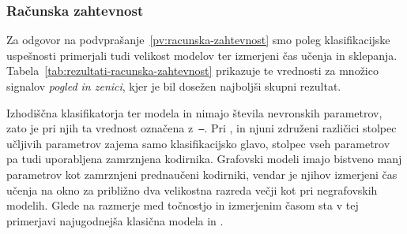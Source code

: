 \subsubsection*{Računska zahtevnost}

Za odgovor na podvprašanje~\ref{pv:racunska-zahtevnost} smo poleg klasifikacijske uspešnosti primerjali tudi velikost modelov ter izmerjeni čas učenja in sklepanja.
Tabela~\ref{tab:rezultati-racunska-zahtevnost} prikazuje te vrednosti za množico signalov \emph{pogled in zenici}, kjer je bil dosežen najboljši skupni rezultat.

Izhodiščna klasifikatorja ter modela  in  nimajo števila nevronskih parametrov, zato je pri njih ta vrednost označena z~\texttt{--}.
Pri ,  in njuni združeni različici stolpec učljivih parametrov zajema samo klasifikacijsko glavo, stolpec vseh parametrov pa tudi uporabljena zamrznjena kodirnika.
Grafovski modeli imajo bistveno manj parametrov kot zamrznjeni prednaučeni kodirniki, vendar je njihov izmerjeni čas učenja na okno za približno dva velikostna razreda večji kot pri negrafovskih modelih.
Glede na razmerje med točnostjo in izmerjenim časom sta v tej primerjavi najugodnejša klasična modela  in .
\newpage



